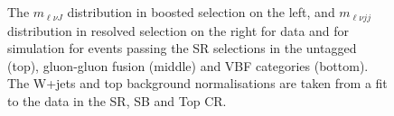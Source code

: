 \begin{figure}[htbp]
{}                                              
\\

\\

\caption{The $m_{\ell \nu J}$ distribution in boosted  selection on the left, and $m_{\ell \nu jj}$ distribution in resolved selection on the right for  data and for simulation for events passing the SR selections in the untagged (top), gluon-gluon fusion (middle) and VBF categories (bottom). 
The W+jets and top background normalisations  are taken from a fit to the data in the SR, SB and Top CR.}
    \label{SR}
\end{figure}

